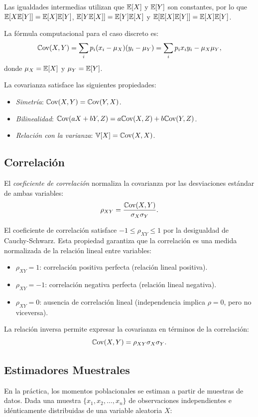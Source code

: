 Las igualdades intermedias utilizan que $\mathbb{E}[X]$ y $\mathbb{E}[Y]$ son constantes, por lo que $\mathbb{E}[X\mathbb{E}[Y]] = \mathbb{E}[X]\mathbb{E}[Y]$, $\mathbb{E}[Y\mathbb{E}[X]] = \mathbb{E}[Y]\mathbb{E}[X]$ y $\mathbb{E}[\mathbb{E}[X]\mathbb{E}[Y]] = \mathbb{E}[X]\mathbb{E}[Y]$.

La fórmula computacional para el caso discreto es:
\[
\mathbb{C}\text{ov}(X,Y) = \sum_i p_i (x_i - \mu_X)(y_i - \mu_Y) = \sum_i p_i x_i y_i - \mu_X \mu_Y,
\]
donde $\mu_X = \mathbb{E}[X]$ y $\mu_Y = \mathbb{E}[Y]$.

La covarianza satisface las siguientes propiedades:
\begin{itemize}
  \item \textit{Simetría}: $\mathbb{C}\text{ov}(X,Y) = \mathbb{C}\text{ov}(Y,X)$.
  \item \textit{Bilinealidad}: $\mathbb{C}\text{ov}(aX + bY, Z) = a\mathbb{C}\text{ov}(X,Z) + b\mathbb{C}\text{ov}(Y,Z)$.
  \item \textit{Relación con la varianza}: $\mathbb{V}[X] = \mathbb{C}\text{ov}(X,X)$.
\end{itemize}

\subsection*{Correlación}

El \textit{coeficiente de correlación} normaliza la covarianza por las desviaciones estándar de ambas variables:
\[
\rho_{XY} = \frac{\mathbb{C}\text{ov}(X,Y)}{\sigma_X \sigma_Y}.
\]

El coeficiente de correlación satisface $-1 \leq \rho_{XY} \leq 1$ por la desigualdad de Cauchy-Schwarz. Esta propiedad garantiza que la correlación es una medida normalizada de la relación lineal entre variables:
\begin{itemize}
  \item $\rho_{XY} = 1$: correlación positiva perfecta (relación lineal positiva).
  \item $\rho_{XY} = -1$: correlación negativa perfecta (relación lineal negativa).
  \item $\rho_{XY} = 0$: ausencia de correlación lineal (independencia implica $\rho = 0$, pero no viceversa).
\end{itemize}

La relación inversa permite expresar la covarianza en términos de la correlación:
\[
\mathbb{C}\text{ov}(X,Y) = \rho_{XY} \sigma_X \sigma_Y.
\]

\subsection*{Estimadores Muestrales}

En la práctica, los momentos poblacionales se estiman a partir de muestras de datos. Dada una muestra $\{x_1, x_2, \ldots, x_n\}$ de observaciones independientes e idénticamente distribuidas de una variable aleatoria $X$:

